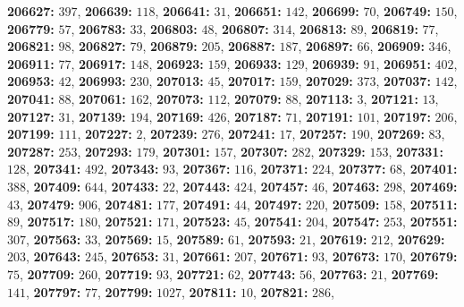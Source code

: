 \textsf{\bfseries 206627:} $397$, \textsf{\bfseries 206639:} $118$, \textsf{\bfseries 206641:} $31$, \textsf{\bfseries 206651:} $142$, \textsf{\bfseries 206699:} $70$, \textsf{\bfseries 206749:} $150$, \textsf{\bfseries 206779:} $57$, \textsf{\bfseries 206783:} $33$, \textsf{\bfseries 206803:} $48$, \textsf{\bfseries 206807:} $314$, \textsf{\bfseries 206813:} $89$, \textsf{\bfseries 206819:} $77$, \textsf{\bfseries 206821:} $98$, \textsf{\bfseries 206827:} $79$, \textsf{\bfseries 206879:} $205$, \textsf{\bfseries 206887:} $187$, \textsf{\bfseries 206897:} $66$, \textsf{\bfseries 206909:} $346$, \textsf{\bfseries 206911:} $77$, \textsf{\bfseries 206917:} $148$, \textsf{\bfseries 206923:} $159$, \textsf{\bfseries 206933:} $129$, \textsf{\bfseries 206939:} $91$, \textsf{\bfseries 206951:} $402$, \textsf{\bfseries 206953:} $42$, \textsf{\bfseries 206993:} $230$, \textsf{\bfseries 207013:} $45$, \textsf{\bfseries 207017:} $159$, \textsf{\bfseries 207029:} $373$, \textsf{\bfseries 207037:} $142$, \textsf{\bfseries 207041:} $88$, \textsf{\bfseries 207061:} $162$, \textsf{\bfseries 207073:} $112$, \textsf{\bfseries 207079:} $88$, \textsf{\bfseries 207113:} $3$, \textsf{\bfseries 207121:} $13$, \textsf{\bfseries 207127:} $31$, \textsf{\bfseries 207139:} $194$, \textsf{\bfseries 207169:} $426$, \textsf{\bfseries 207187:} $71$, \textsf{\bfseries 207191:} $101$, \textsf{\bfseries 207197:} $206$, \textsf{\bfseries 207199:} $111$, \textsf{\bfseries 207227:} $2$, \textsf{\bfseries 207239:} $276$, \textsf{\bfseries 207241:} $17$, \textsf{\bfseries 207257:} $190$, \textsf{\bfseries 207269:} $83$, \textsf{\bfseries 207287:} $253$, \textsf{\bfseries 207293:} $179$, \textsf{\bfseries 207301:} $157$, \textsf{\bfseries 207307:} $282$, \textsf{\bfseries 207329:} $153$, \textsf{\bfseries 207331:} $128$, \textsf{\bfseries 207341:} $492$, \textsf{\bfseries 207343:} $93$, \textsf{\bfseries 207367:} $116$, \textsf{\bfseries 207371:} $224$, \textsf{\bfseries 207377:} $68$, \textsf{\bfseries 207401:} $388$, \textsf{\bfseries 207409:} $644$, \textsf{\bfseries 207433:} $22$, \textsf{\bfseries 207443:} $424$, \textsf{\bfseries 207457:} $46$, \textsf{\bfseries 207463:} $298$, \textsf{\bfseries 207469:} $43$, \textsf{\bfseries 207479:} $906$, \textsf{\bfseries 207481:} $177$, \textsf{\bfseries 207491:} $44$, \textsf{\bfseries 207497:} $220$, \textsf{\bfseries 207509:} $158$, \textsf{\bfseries 207511:} $89$, \textsf{\bfseries 207517:} $180$, \textsf{\bfseries 207521:} $171$, \textsf{\bfseries 207523:} $45$, \textsf{\bfseries 207541:} $204$, \textsf{\bfseries 207547:} $253$, \textsf{\bfseries 207551:} $307$, \textsf{\bfseries 207563:} $33$, \textsf{\bfseries 207569:} $15$, \textsf{\bfseries 207589:} $61$, \textsf{\bfseries 207593:} $21$, \textsf{\bfseries 207619:} $212$, \textsf{\bfseries 207629:} $203$, \textsf{\bfseries 207643:} $245$, \textsf{\bfseries 207653:} $31$, \textsf{\bfseries 207661:} $207$, \textsf{\bfseries 207671:} $93$, \textsf{\bfseries 207673:} $170$, \textsf{\bfseries 207679:} $75$, \textsf{\bfseries 207709:} $260$, \textsf{\bfseries 207719:} $93$, \textsf{\bfseries 207721:} $62$, \textsf{\bfseries 207743:} $56$, \textsf{\bfseries 207763:} $21$, \textsf{\bfseries 207769:} $141$, \textsf{\bfseries 207797:} $77$, \textsf{\bfseries 207799:} $1027$, \textsf{\bfseries 207811:} $10$, \textsf{\bfseries 207821:} $286$, 
